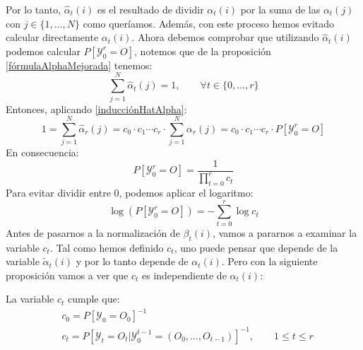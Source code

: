 Por lo tanto, $\hat{\alpha}_t(i)$ es el resultado de dividir $\alpha_t(i)$ por la suma de las $\alpha_t(j)$ con $j\in\{1,\dots,N\}$ como queríamos. Además, con este proceso hemos evitado calcular directamente $\alpha_t(i)$. Ahora debemos comprobar que utilizando $\hat{\alpha}_t(i)$ podemos calcular $P[\mathcal{Y}_0^r=O]$, notemos que de la proposición \ref{fórmulaAlphaMejorada} tenemos:
\[\sum_{j=1}^N\hat{\alpha}_t(j)=1, \qquad \forall t\in\{0,\dots,r\} \]
Entonces, aplicando \eqref{inducciónHatAlpha}:
\[
    1=\sum_{j=1}^N\hat{\alpha}_r(j)=c_0\cdot c_1\cdots c_r\cdot\sum_{j=1}^N\alpha_r(j) = c_0\cdot c_1\cdots c_r\cdot P[\mathcal{Y}_0^r=O]
\]
En consecuencia:
\[P[\mathcal{Y}_0^r=O]=\dfrac{1}{\displaystyle\prod_{t=0}^r c_t}\]
Para evitar dividir entre $0$, podemos aplicar el logaritmo:
\[\log\left(P[\mathcal{Y}_0^r=O]\right)=-\sum_{t=0}^r\log c_t\]
Antes de pasarnos a la normalización de $\beta_t(i)$, vamos a pararnos a examinar la variable $c_t$. Tal como hemos definido $c_t$, uno puede pensar que depende de la variable $\tilde{\alpha}_t(i)$ y por lo tanto depende de $\alpha_t(i)$. Pero con la siguiente proposición vamos a ver que $c_t$ es independiente de $\alpha_t(i)$:
\begin{proposition}
La variable $c_t$ cumple que:
\[
\begin{aligned}
    &c_0=P[\mathcal{Y}_0=O_0]^{-1} \\
    &c_t=P[\mathcal{Y}_t=O_t|\mathcal{Y}_0^{t-1}=(O_0,\dots,O_{t-1})]^{-1}, \qquad 1\leq t\leq r
\end{aligned}
\]
\end{proposition}
